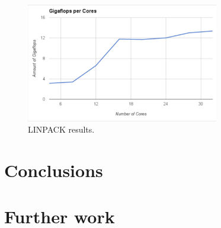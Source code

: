 \begin{figure}[tbh]
\begin{center}
\includegraphics[width=0.75\textwidth]{minimalgraph.JPG}
\end{center}
\caption{LINPACK results. \label{linpackresults}}
\end{figure}

\section{Conclusions}

\section{Further work}  
